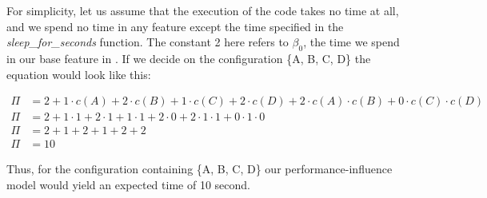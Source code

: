 For simplicity, let us assume that the execution of the code takes no time at all, and we spend no time in any feature except the time specified in the 
\textit{sleep\_for\_seconds} function.
The constant 2 here refers to $\beta_0$, the time we spend in our base feature in .
If we decide on the configuration \{A, B, C, D\} the equation would look like this:

\begin{align*}
    \Pi &= 2 + 1 \cdot c(A) + 2\cdot c(B) + 1\cdot c(C) + 2\cdot c(D) + 2 \cdot c(A)\cdot c(B) + 0\cdot c(C) \cdot c(D) \\
    \Pi &= 2 + 1 \cdot 1 + 2 \cdot 1 + 1 \cdot 1 + 2 \cdot 0 + 2 \cdot 1 \cdot 1 + 0 \cdot 1 \cdot 0 \\
    \Pi &= 2 + 1 + 2 + 1 + 2 + 2 \\
    \Pi &= 10
\end{align*}

Thus, for the configuration containing \{A, B, C, D\} our performance-influence model would yield an expected time of 10 second.